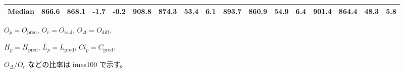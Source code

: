 \begin{threeparttable}
{\begin{tabular}{lrrrrrrrrrrrrrrrr}
 Median & 866.6 & 868.1 &       -1.7 &           -0.2 &  908.8 & 874.3 &       53.4 &            6.1 &  893.7 & 860.9 &       54.9 &            6.4 &  901.4 &  864.4 &        48.3 &              5.8 \\
\bottomrule
\end{tabular}
}
\begin{tablenotes}\footnotesize
\item $O_p=O_{\text{pred}}$, $O_r=O_{\text{real}}$, $O_\Delta=O_{\text{diff}}$.
\item $H_p=H_{\text{pred}}$, $L_p=L_{\text{pred}}$, $Cl_p=C_{\text{pred}}$.
\item $O_\Delta/O_r$ などの比率は 	imes100 で示す。
\end{tablenotes}
\end{threeparttable}
\endgroup
